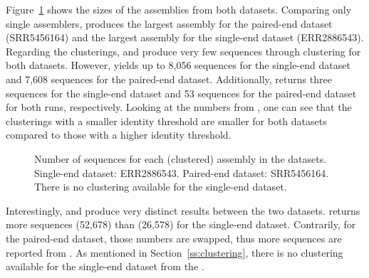 \documentclass[12pt,a4paper,english]{article}
\begin{document}
	    Figure~\ref{img:barcharts:cel} shows the sizes of the assemblies from both \celegans datasets.
		Comparing only single assemblers, \spades produces the largest assembly for the paired-end dataset (SRR5456164) and \soap the largest assembly for the single-end dataset (ERR2886543).
		Regarding the clusterings, \grouper and \karma produce very few sequences through clustering for both datasets. However, \karma yields up to 8,056 sequences for the single-end dataset and 7,608 sequences for the paired-end dataset. Additionally, \grouper returns three sequences for the single-end dataset and 53 sequences for the paired-end dataset for both runs, respectively.
		Looking at the numbers from \cdhit, one can see that the clusterings with a smaller identity threshold are smaller for both datasets compared to those with a higher identity threshold.
		\begin{figure}[H]
			\centering
			\def\svgwidth{\textwidth}
			
			\caption[Number of sequences for each (clustered) assembly in the \celegans datasets.]{Number of sequences for each (clustered) assembly in the \celegans datasets. Single-end dataset: ERR2886543. Paired-end dataset: SRR5456164. There is no \orp clustering available for the single-end dataset.}
			\label{img:barcharts:cel}
		\end{figure}
		Interestingly, \mclust and \mclusttwo produce very distinct results between the two datasets. \mclust returns more sequences (52,678) than \mclusttwo (26,578) for the single-end dataset. Contrarily, for the paired-end dataset, those numbers are swapped, thus more sequences are reported from \mclusttwo.
		As mentioned in Section~\ref{ss:clustering}, there is no clustering available for the single-end dataset from the \orp.
\end{document}
